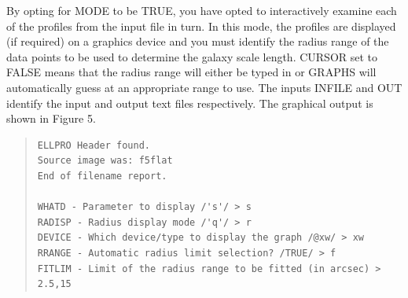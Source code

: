 \documentclass[twoside,11pt]{article}
\newenvironment{myquote}{\begin{quote}\begin{small}}{\end{small}\end{quote}}
\begin{document}
By opting for MODE to be TRUE, you have opted to interactively examine
each of the profiles from the input file in turn. In this mode, the profiles are
displayed (if required) on a graphics device and you must
identify the radius range of the data points to be used to determine the
galaxy scale length. CURSOR set to FALSE means that the radius range will
either be typed in or GRAPHS will automatically guess at an
appropriate range to use. The inputs INFILE and OUT identify the input and
output text files respectively. The graphical output is shown in
Figure 5.

\begin{myquote}
\begin{verbatim}
ELLPRO Header found.
Source image was: f5flat
End of filename report.

WHATD - Parameter to display /'s'/ > s
RADISP - Radius display mode /'q'/ > r
DEVICE - Which device/type to display the graph /@xw/ > xw
RRANGE - Automatic radius limit selection? /TRUE/ > f
FITLIM - Limit of the radius range to be fitted (in arcsec) > 2.5,15
\end{verbatim}
\end{myquote}
\end{document}
